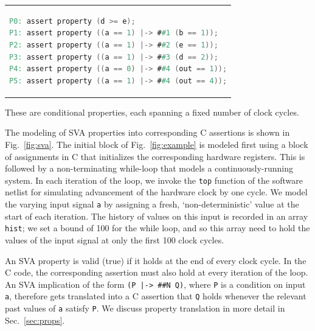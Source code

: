 \begin{center}
\begin{tabular}[t]{@{}l@{}}
\begin{lstlisting}[mathescape=true,language=Verilog,basicstyle=\scriptsize\ttfamily]
P0: assert property (d >= e);
P1: assert property ((a == 1) |-> ##1 (b == 1));
P2: assert property ((a == 1) |-> ##2 (e == 1));
P3: assert property ((a == 1) |-> ##3 (d == 2));
P4: assert property ((a == 0) |-> ##4 (out == 1));
P5: assert property ((a == 1) |-> ##4 (out == 4));
\end{lstlisting}
\end{tabular}
\end{center}

\noindent These are conditional properties, each spanning a fixed number of clock cycles. 
 
The modeling of SVA properties into corresponding C assertions is shown in Fig.\ \ref{fig:sva}. The initial block of Fig.\ \ref{fig:example} is modeled first using a block of assignments in C that initializes the corresponding hardware registers.  This is followed by a non-terminating while-loop that models a continuously-running system. In each iteration of the loop, we invoke the \texttt{top} function of the software netlist for simulating advancement of the hardware clock by one cycle.   We model the varying input signal \texttt{a} by assigning a fresh, `non-deterministic' value at the start of each iteration. The history of values on this input is recorded in an array \texttt{hist}; we set a bound of 100 for the while loop, and so this array need to hold the values of the input signal at only the first 100 clock cycles. 

An SVA property is valid (true) if it holds at the end of every clock cycle. In the C code, the corresponding assertion must also hold at every iteration of the loop. An SVA implication of the form \texttt{(P |-> \#\#N Q)}, where \texttt{P} is a condition on input \texttt{a}, therefore gets translated into a C assertion that \texttt{Q} holds whenever the relevant past values of \texttt{a} satisfy \texttt{P}. We discuss property translation in more detail in Sec.\ \ref{sec:props}.

